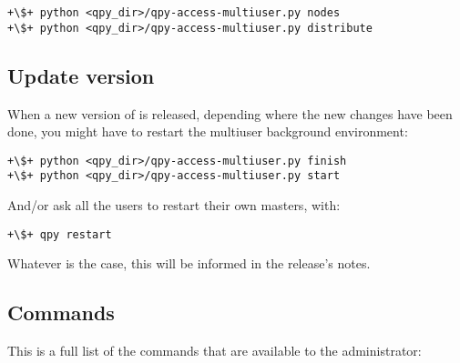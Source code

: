\documentclass[a4paper,12pt]{article}
\begin{document}
\begin{lstlisting}[style=BashStyle]
+\$+ python <qpy_dir>/qpy-access-multiuser.py nodes
+\$+ python <qpy_dir>/qpy-access-multiuser.py distribute
\end{lstlisting}

\subsection{Update version}

When a new version of \qpy{} is released, depending where the new changes have been done, you might have to restart the multiuser background environment:

\begin{lstlisting}[style=BashStyle]
+\$+ python <qpy_dir>/qpy-access-multiuser.py finish
+\$+ python <qpy_dir>/qpy-access-multiuser.py start
\end{lstlisting}

And/or ask all the users to restart their own masters, with:

\begin{lstlisting}[style=BashStyle]
+\$+ qpy restart
\end{lstlisting}

Whatever is the case, this will be informed in the release's notes.


\subsection{Commands}

This is a full list of the commands that are available to the administrator:
\end{document}
